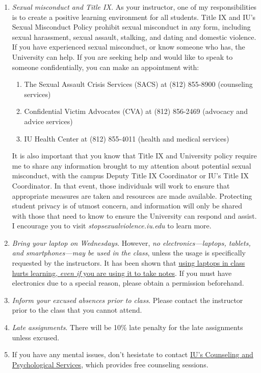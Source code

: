 \documentclass[11pt,article,oneside]{memoir} %
\begin{document}
\begin{enumerate}
\item \emph{Sexual misconduct and Title IX.} As your instructor, one of my
responsibilities is to create a positive learning environment for all students.
Title IX and IU's Sexual Misconduct Policy prohibit sexual misconduct in any
form, including sexual harassment, sexual assault, stalking, and dating and
domestic violence.  If you have experienced sexual misconduct, or know someone
who has, the University can help. If you are seeking help and would like to
speak to someone confidentially, you can make an appointment with:

\begin{enumerate}
    
\item The Sexual Assault Crisis Services (SACS) at (812) 855-8900 (counseling services)
\item Confidential Victim Advocates (CVA) at (812) 856-2469 (advocacy and advice services)
\item IU Health Center at (812) 855-4011 (health and medical services)

\end{enumerate}

It is also important that you know that Title IX and University policy require me to share any information brought to my attention about potential sexual misconduct, with the campus Deputy Title IX Coordinator or IU's Title IX Coordinator. 
In that event, those individuals will work to ensure that appropriate measures are taken and resources are made available. 
Protecting student privacy is of utmost concern, and information will only be shared with those that need to know to ensure the University can respond and assist. 
I encourage you to visit \emph{stopsexualviolence.iu.edu} to learn more. 

\item \emph{Bring your laptop on Wednesdays}. However, \emph{no electronics---laptops, tablets, and smartphones---may be used in the class}, unless the usage is specifically requested by the instructors. 
It has been shown that \href{http://www.scientificamerican.com/article/a-learning-secret-don-t-take-notes-with-a-laptop/}{using laptops in class hurts learning, \emph{even if} you are using it to take notes}.  
If you must have electronics due to a special reason, please obtain a permission beforehand. 

\item \emph{Inform your excused absences prior to class}. Please contact the instructor prior to the class that you cannot attend. 

\item \emph{Late assignments}. There will be 10\% late penalty for the late assignments unless excused. 

\item If you have any mental issues, don't hesistate to contact \href{http://healthcenter.indiana.edu/counseling/index.shtml}{IU's Counseling and Psychological Services}, which provides free counseling sessions. 


\end{enumerate}%
\end{document}
